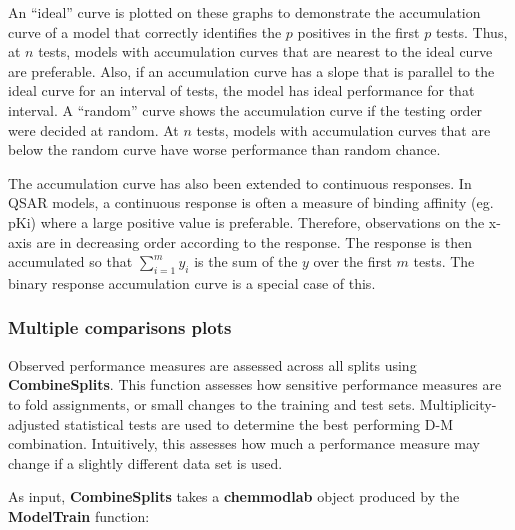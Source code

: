 An ``ideal'' curve is plotted on these graphs to demonstrate the
accumulation curve of a model that correctly identifies the \(p\)
positives in the first \(p\) tests. Thus, at \(n\) tests, models with
accumulation curves that are nearest to the ideal curve are preferable.
Also, if an accumulation curve has a slope that is parallel to the ideal
curve for an interval of tests, the model has ideal performance for that
interval. A ``random'' curve shows the accumulation curve if the testing
order were decided at random. At \(n\) tests, models with accumulation
curves that are below the random curve have worse performance than
random chance.

The accumulation curve has also been extended to continuous responses.
In QSAR models, a continuous response is often a measure of binding
affinity (eg. pKi) where a large positive value is preferable.
Therefore, observations on the x-axis are in decreasing order according
to the response. The response is then accumulated so that
\(\sum_{i=1}^{m} y_i\) is the sum of the \(y\) over the first \(m\)
tests. The binary response accumulation curve is a special case of this.

\subsubsection{Multiple comparisons
plots}\label{multiple-comparisons-plots}

Observed performance measures are assessed across all splits using
\textbf{CombineSplits}. This function assesses how sensitive performance
measures are to fold assignments, or small changes to the training and
test sets. Multiplicity-adjusted statistical tests are used to determine
the best performing D-M combination. Intuitively, this assesses how much
a performance measure may change if a slightly different data set is
used.

As input, \textbf{CombineSplits} takes a \textbf{chemmodlab} object
produced by the \textbf{ModelTrain} function:

